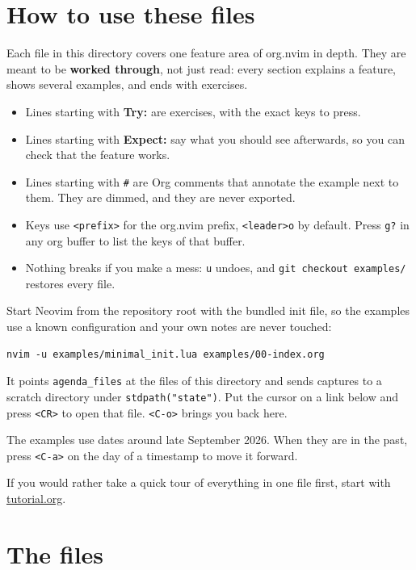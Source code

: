 \section{How to use these files}
\label{sec:org2dc5823}
Each file in this directory covers one feature area of org.nvim in depth.
They are meant to be \textbf{worked through}, not just read: every section explains
a feature, shows several examples, and ends with exercises.

\begin{itemize}
\item Lines starting with \textbf{Try:} are exercises, with the exact keys to press.
\item Lines starting with \textbf{Expect:} say what you should see afterwards, so you can
check that the feature works.
\item Lines starting with \texttt{\#} are Org comments that annotate the example next to
them. They are dimmed, and they are never exported.
\item Keys use \texttt{<prefix>} for the org.nvim prefix, \texttt{<leader>o} by default.
Press \texttt{g?} in any org buffer to list the keys of that buffer.
\item Nothing breaks if you make a mess: \texttt{u} undoes, and
\texttt{git checkout examples/} restores every file.
\end{itemize}

Start Neovim from the repository root with the bundled init file, so the
examples use a known configuration and your own notes are never touched:

\begin{verbatim}
nvim -u examples/minimal_init.lua examples/00-index.org
\end{verbatim}

It points \texttt{agenda\_files} at the files of this directory and sends captures to
a scratch directory under \texttt{stdpath("state")}. Put the cursor on a link below
and press \texttt{<CR>} to open that file. \texttt{<C-o>} brings you back here.

The examples use dates around late September 2026. When they are in the
past, press \texttt{<C-a>} on the day of a timestamp to move it forward.

If you would rather take a quick tour of everything in one file first, start
with \href{tutorial.org}{tutorial.org}.
\section{The files}
\label{sec:org1183b91}
